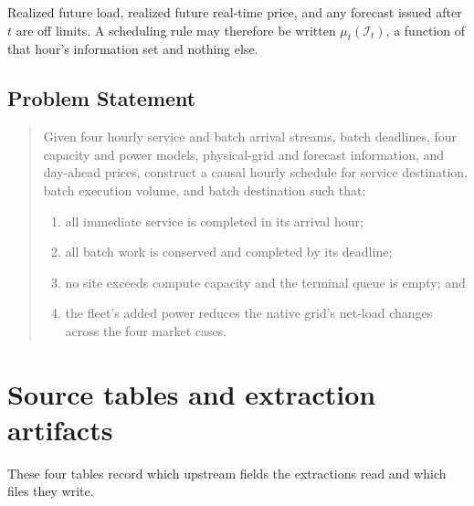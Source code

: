 \documentclass[12pt]{article}
\begin{document}
Realized future load, realized future real-time price, and any forecast issued after \(t\) are off limits. A scheduling rule may therefore be written \(\mu_t(\mathcal{I}_t)\), a function of that hour's information set and nothing else.

\subsection{Problem Statement}
\label{subsec:problem-formal-statement}

\begin{quote}
Given four hourly service and batch arrival streams, batch
deadlines, four capacity and power models, physical-grid and forecast
information, and day-ahead prices, construct a causal hourly schedule for
service destination, batch execution volume, and batch destination such that:
\begin{enumerate}
  \item all immediate service is completed in its arrival hour;
  \item all batch work is conserved and completed by its deadline;
  \item no site exceeds compute capacity and the terminal queue is empty; and
  \item the fleet's added power reduces the native grid's net-load changes across the four market cases.
\end{enumerate}
\end{quote}

\appendix
\section{Source tables and extraction artifacts}
\label{app:source-tables}

These four tables record which upstream fields the extractions read and which files they write.
\end{document}
